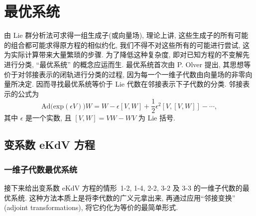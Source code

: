 \section{最优系统}
由 Lie 群分析法可求得一组生成子(或向量场), 理论上讲, 这些生成子的所有可能的组合都可能求得原方程的相似约化, 我们不得不对这些所有的可能进行尝试, 这为实际计算带来大量繁琐的步骤. 为了降低这种复杂度, 即对已知方程的不变解先进行分类, ``最优系统'' 的概念应运而生. 最优系统首次由 P. Olver 提出, 其思想等价于对邻接表示的闭轨进行分类的过程, 因为每一个一维子代数由向量场的非零向量所决定. 因而寻找最优系统等价于 Lie 代数在邻接表示下子代数的分类. 邻接表示的公式为
$$\text{Ad(exp}(\epsilon V))W=W-\epsilon[V,W]+\frac{1}{2}\epsilon^2[V,[V,W]]-\cdots,$$
其中 $\epsilon$ 是一个实数, 且 $[V,W]=VW-WV$ 为 Lie 括号.
\subsection{变系数 eKdV 方程}
\subsubsection{一维子代数最优系统}
接下来给出变系数 eKdV 方程的情形~1-2, 1-4, 2-2, 3-2 及 3-3 的一维子代数的最优系统. 这种方法本质上是将李代数的广义元拿出来, 再通过应用``邻接变换'' (adjoint transformations), 将它约化为等价的最简单形式.

